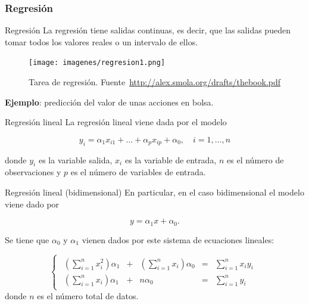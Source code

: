 \documentclass[hyperref={unicode}]{beamer}
\begin{document}
\subsubsection{Regresión}
\begin{frame}{Regresión}
	La regresión tiene salidas continuas, es decir, que las salidas pueden tomar todos los valores reales o un intervalo de ellos. 
		\begin{figure}
				\begin{center}
				\texttt{[image: imagenes/regresion1.png]}
				\caption{Tarea de regresión. Fuente~\url{http://alex.smola.org/drafts/thebook.pdf}}
				\end{center}
		\end{figure}
		
		\textbf{Ejemplo}: predicción del valor de unas acciones en bolsa. 
\end{frame}

\begin{frame}{Regresión lineal}
	La regresión lineal viene dada por el modelo
	
	\begin{equation}
	y_i = \alpha_1 x_{i1} + \dots + \alpha_p x_{ip} + \alpha_0, \quad i = 1,...,n
	\end{equation}
	
	donde $y_i$ es la variable salida, $x_{i}$ es la variable de entrada, $n$ es el número de observaciones y $p$ es el número de variables de entrada.
	
	\begin{figure}
	\centering
	\qquad\qquad

	\end{figure}
\end{frame}


\begin{frame}{Regresión lineal (bidimensional)}
	En particular, en el caso bidimensional el modelo viene dado por
	
	\begin{equation}
	y = \alpha_1 x + \alpha_0.
	\end{equation}
	
	Se tiene que $\alpha_0$ y $\alpha_1$ vienen dados por este sistema de ecuaciones lineales:
	
	\begin{equation}
	\begin{cases}
	\begin{array}{ccccc}
	\left(\displaystyle\sum_{i=1}^{n} x_i^2\right) \alpha_1 & + & \left(\displaystyle\sum_{i=1}^{n} x_i\right) \alpha_0 & = & \displaystyle \sum_{i=1}^{n} x_i y_i \\
	 \left(\displaystyle \sum_{i=1}^{n} x_i\right) \alpha_1 & + & n \alpha_0 & = & \displaystyle \sum_{i=1}^{n} y_i
	\end{array}
	\end{cases}
	\end{equation}
	donde $n$ es el número total de datos.
\end{frame}
\end{document}

